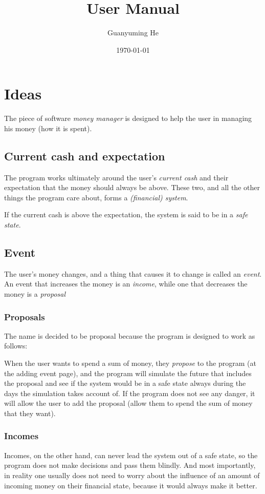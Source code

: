 \documentclass{article}
\title{User Manual}
\date{\today}
\author{Guanyuming He}
\begin{document}
\maketitle

\section{Ideas}
The piece of software \emph{money manager} is designed to help the user in managing his money (how it is spent).

\subsection{Current cash and expectation}
The program works ultimately around the user's \emph{current cash} and their expectation that the money should always be above. These two, and all the other things the program care about, forms a \emph{(financial) system}.

If the current cash is above the expectation, the system is said to be in a \emph{safe state}.

\subsection{Event}
The user's money changes, and a thing that causes it to change is called an \emph{event}. An event that increases the money is an \emph{income}, while one that decreases the money is a \emph{proposal}

\subsubsection{Proposals}
The name is decided to be proposal because the program is designed to work as follows:

When the user wants to spend a sum of money, they \emph{propose} to the program (at the adding event page), and the program will simulate the future that includes the proposal and see if the system would be in a safe state always during the days the simulation takes account of. If the program does not see any danger, it will allow the user to add the proposal (allow them to spend the sum of money that they want).

\subsubsection{Incomes}
Incomes, on the other hand, can never lead the system out of a safe state, so the program does not make decisions and pass them blindly. And most importantly, in reality one usually does not need to worry about the influence of an amount of incoming money on their financial state, because it would always make it better.
\end{document}
